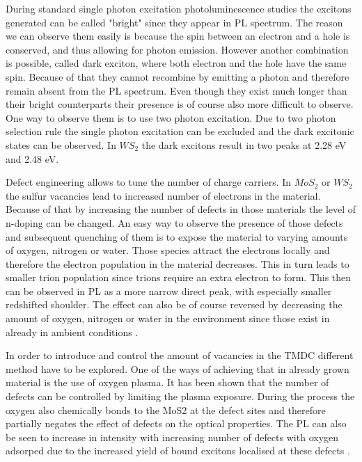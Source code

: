 During standard single photon excitation photoluminescence studies the excitons generated can be called "bright" since they appear in PL spectrum. The reason we can observe them easily is because the spin between an electron and a hole is conserved, and thus allowing for photon emission. However another combination is possible, called dark exciton, where both electron and the hole have the same spin. Because of that they cannot recombine by emitting a photon and therefore remain absent from the PL spectrum. Even though they exist much longer than their bright counterparts their presence is of course also more difficult to observe. One way to observe them is to use two photon excitation. Due to two photon selection rule the single photon excitation can be excluded and the dark excitonic states can be observed. In $WS_2$ the dark excitons result in two peaks at 2.28 eV and 2.48 eV. \cite{Ye2014}
	
Defect engineering allows to tune the number of charge carriers. In $MoS_2$ or $WS_2$ the sulfur vacancies lead to increased number of electrons in the material. Because of that by increasing the number of defects in those materials the level of n-doping can be changed. An easy way to observe the presence of those defects and subsequent quenching of them is to expose the material to varying amounts of oxygen, nitrogen or water. Those species attract the electrons locally and therefore the electron population in the material decreases. This in turn leads to smaller trion population since trions require an extra electron to form. This then can be observed in PL as a more narrow direct peak, with especially smaller redshifted shoulder. The effect can also be of course reversed by decreasing the amount of oxygen, nitrogen or water in the environment since those exist in already in ambient conditions \cite{Currie2015}.
	
In order to introduce and control the amount of vacancies in the TMDC different method have to be explored. One of the ways of achieving that in already grown material is the use of oxygen plasma. It has been shown that the number of defects can be controlled by limiting the plasma exposure. During the process the oxygen also chemically bonds to the MoS2 at the defect sites and therefore partially negates the effect of defects on the optical properties. The PL can also be seen to increase in intensity with increasing number of defects with oxygen adsorped due to the increased yield of bound excitons localised at these defects \cite{Nan2014}.
	
